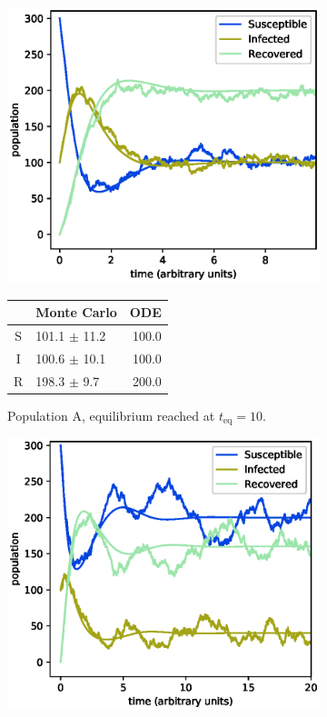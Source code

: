 \documentclass[a4paper,10pt,twocolumn]{article}
\begin{document}
\begin{figure}
	\centering
\begin{subfigure}{.5\textwidth}
	\centering
	\includegraphics[width=\linewidth]{a4b1c05_1.eps}
	\small
	\begin{tabular}{c l r}
	  &    Monte Carlo   &  ODE  \\ \hline
	S &  101.1 $\pm$ 11.2 &  100.0 \\
	I &  100.6 $\pm$ 10.1 &  100.0 \\
	R &  198.3 $\pm$  9.7 &  200.0 \\\hline
	\end{tabular}
	\caption{Population A, equilibrium reached at $t_\mathrm{eq}=10$.} 
	\label{fig:aA}
\end{subfigure}%
\begin{subfigure}{.5\textwidth}
	\centering
	\includegraphics[width=\linewidth]{a4b2c05_1.eps}

\end{subfigure}
\end{figure}
\end{document}
